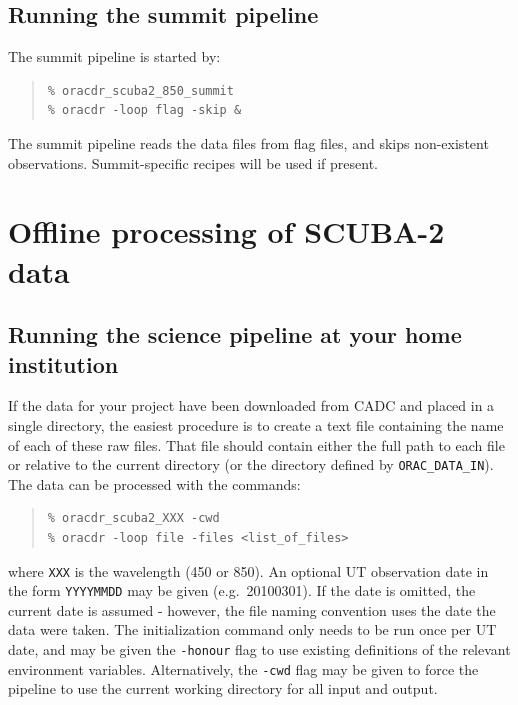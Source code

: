 \documentclass[twoside,11pt]{article}
\newcommand{\xlabel}[1]{}
\renewcommand{\_}{\texttt{\symbol{95}}}
\newenvironment{myquote}{\begin{quote}\begin{small}}{\end{small}\end{quote}}
\begin{document}
\subsection{Running the summit pipeline}

The summit pipeline is started by:
\begin{myquote}
\begin{verbatim}
% oracdr_scuba2_850_summit
% oracdr -loop flag -skip &
\end{verbatim}
\end{myquote}
The summit pipeline reads the data files from flag files, and skips
non-existent observations. Summit-specific recipes will be used if
present.


\section{\xlabel{offline}Offline processing of SCUBA-2 data\label{se:offline}}

\subsection{Running the science pipeline at your home institution}

If the data for your project have been downloaded from CADC and placed
in a single directory, the easiest procedure is to create a text file
containing the name of each of these raw files. That file should
contain either the full path to each file or relative to the current
directory (or the directory defined by \verb+ORAC_DATA_IN+). The data
can be processed with the commands:
\begin{myquote}
\begin{verbatim}
% oracdr_scuba2_XXX -cwd
% oracdr -loop file -files <list_of_files>
\end{verbatim}
\end{myquote}
where \verb+XXX+ is the wavelength (450 or 850). An optional UT
observation date in the form \verb+YYYYMMDD+ may be given (e.g.\
20100301). If the date is omitted, the current date is assumed -
however, the file naming convention uses the date the data were
taken. The initialization command only needs to be run once per UT
date, and may be given the \verb+-honour+ flag to use existing
definitions of the relevant environment variables. Alternatively, the
\verb+-cwd+ flag may be given to force the pipeline to use the current
working directory for all input and output.
\end{document}
